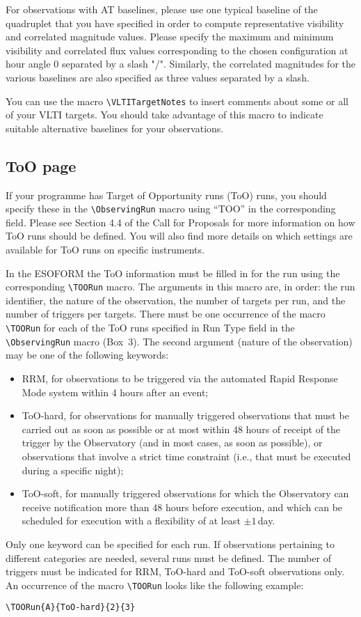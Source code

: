 \documentclass{article}
\begin{document}
For observations with AT baselines, please use one typical baseline of the
quadruplet that you have specified in order to compute
representative visibility and correlated magnitude values.
Please specify the maximum and minimum visibility and correlated flux values
corresponding to the chosen configuration at hour angle 0 separated by 
a slash "/".
Similarly, the correlated magnitudes for the various baselines are also
specified as three values separated by a slash.

You can use the macro \verb|\VLTITargetNotes| to insert comments about
some or all of your VLTI targets. You should take advantage of this
macro to indicate suitable alternative baselines for your
observations.

\subsection{ToO page}
\label{sec:toopage}


If your programme has Target of Opportunity runs (ToO) runs, 
you should specify these in the  \verb|\ObservingRun| macro 
using ``TOO'' in the corresponding field. 
Please see Section 4.4 of the Call for Proposals for more information on how ToO runs should be defined.
You will also find more details on which settings are available for ToO runs on specific instruments.

In the ESOFORM the ToO information must be filled in for the run
using the corresponding   \verb|\TOORun| macro.  The arguments in this macro 
are, in order: the run identifier,
the nature of the observation, the number of 
targets per run, and the number of triggers per targets. There must be
one occurrence of the macro \verb|\TOORun| for each of the ToO runs specified
in Run Type field in  the \verb|\ObservingRun| macro (Box~3).
 The second argument (nature of the observation) may be one
of the following keywords:
\begin{itemize}
\item RRM, for observations to be triggered via the automated Rapid
  Response Mode system within 4 hours after an event;
\item ToO-hard, for observations for manually triggered observations that must
  be carried out as soon as possible or at most within 48 hours of receipt of the trigger by the
  Observatory (and in most cases, as soon as possible), or observations that
  involve a strict time constraint (i.e., that must be executed during
  a specific night);
\item ToO-soft, for manually triggered observations for which the
  Observatory can receive notification more than 48 hours before
  execution, and which can be scheduled for execution with a
  flexibility of at least $\pm1$\,day.
\end{itemize}
Only one keyword can be specified for each run. If observations
pertaining to different categories are needed,
several runs must be defined. The number of triggers must be indicated
for RRM, ToO-hard and ToO-soft observations only.
An occurrence of the macro \verb|\TOORun|
looks like the following example:
\begin{verbatim}
\TOORun{A}{ToO-hard}{2}{3}
\end{verbatim}
\end{document}
